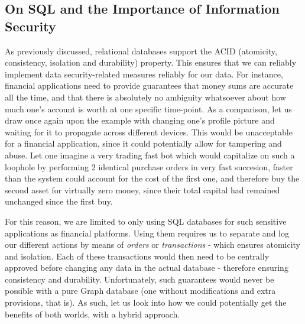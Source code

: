 \documentclass[10pt,        %
               a4paper,     %
               journal,     %
               ]{IEEEtran}
\begin{document}
\subsection{On SQL and the Importance of Information Security}
As previously discussed, relational databases support the ACID (atomicity, consistency, isolation and durability) property. This ensures that we can reliably implement data security-related measures reliably for our data. For instance, financial applications need to provide guarantees that money sums are accurate all the time, and that there is absolutely no ambiguity whatsoever about how much one's account is worth at one specific time-point. As a comparison, let us draw once again upon the example with changing one's profile picture and waiting for it to propagate across different devices. This would be unacceptable for a financial application, since it could potentially allow for tampering and abuse. Let one imagine a very trading fast bot which would capitalize on such a loophole by performing 2 identical purchase orders in very fast succesion, faster than the system could account for the cost of the first one, and therefore buy the second asset for virtually zero money, since their total capital had remained unchanged since the first buy. \par
For this reason, we are limited to only using SQL databases for such sensitive applications as financial platforms. Using them requires us to separate and log our different actions by means of \textit{orders} or \textit{transactions} - which ensures atomicity and isolation. Each of these transactions would then need to be centrally approved before changing any data in the actual database - therefore ensuring consistency and durability. Unfortunately, such guarantees would never be possible with a pure Graph database (one without modifications and extra provisions, that is). As such, let us look into how we could potentially get the benefits of both worlds, with a hybrid approach.\par
\end{document}
